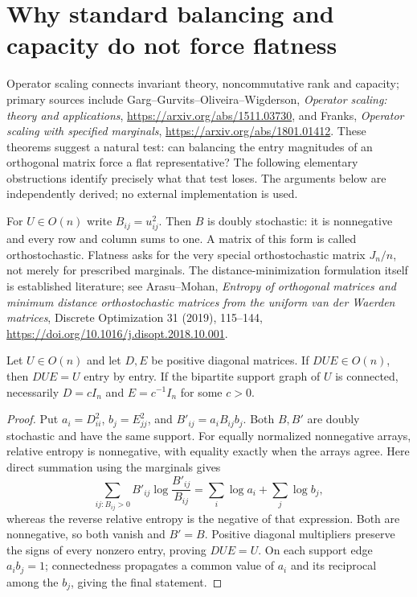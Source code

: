 \section{Why standard balancing and capacity do not force flatness}
\label{s09:sec:capacity-obstruction}

Operator scaling connects invariant theory, noncommutative rank and
capacity; primary sources include Garg--Gurvits--Oliveira--Wigderson,
\emph{Operator scaling: theory and applications},
\url{https://arxiv.org/abs/1511.03730}, and Franks,
\emph{Operator scaling with specified marginals},
\url{https://arxiv.org/abs/1801.01412}. These theorems suggest a natural
test: can balancing the entry magnitudes of an orthogonal matrix force
a flat representative? The following elementary obstructions identify
precisely what that test loses. The arguments below are independently
derived; no external implementation is used.

For $U\in O(n)$ write $B_{ij}=u_{ij}^2$. Then $B$ is doubly stochastic:
it is nonnegative and every row and column sums to one. A matrix of
this form is called orthostochastic. Flatness asks for the very special
orthostochastic matrix $J_n/n$, not merely for prescribed marginals.
The distance-minimization formulation itself is established literature;
see Arasu--Mohan, \emph{Entropy of orthogonal matrices and minimum
distance orthostochastic matrices from the uniform van der Waerden
matrices}, Discrete Optimization 31 (2019), 115--144,
\url{https://doi.org/10.1016/j.disopt.2018.10.001}.

\begin{proposition}
Let $U\in O(n)$ and let $D,E$ be positive diagonal matrices.
If $DUE\in O(n)$, then $DUE=U$ entry by entry.
If the bipartite support graph of $U$ is connected, necessarily
$D=cI_n$ and $E=c^{-1}I_n$ for some $c>0$.
\end{proposition}
\begin{proof}
Put $a_i=D_{ii}^2$, $b_j=E_{jj}^2$, and
$B'_{ij}=a_iB_{ij}b_j$. Both $B,B'$ are doubly stochastic and have
the same support. For equally normalized nonnegative arrays, relative
entropy is nonnegative, with equality exactly when the arrays agree.
Here direct summation using the marginals gives
\[
 \sum_{ij:B_{ij}>0}B'_{ij}\log\frac{B'_{ij}}{B_{ij}}
 =\sum_i\log a_i+\sum_j\log b_j,
\]
whereas the reverse relative entropy is the negative of that expression.
Both are nonnegative, so both vanish and $B'=B$.
Positive diagonal multipliers preserve the signs of every nonzero
entry, proving $DUE=U$. On each support edge $a_ib_j=1$;
connectedness propagates a common value of $a_i$ and its reciprocal
among the $b_j$, giving the final statement.
\end{proof}

